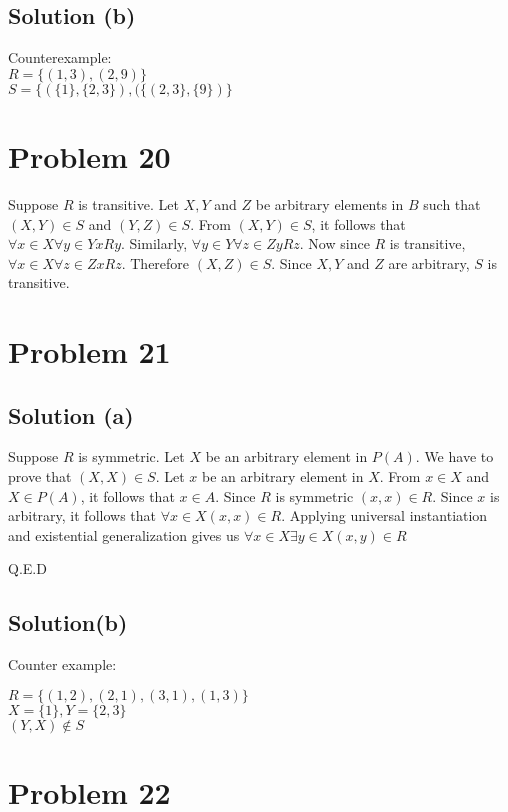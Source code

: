 \documentclass{article}
\begin{document}
\subsection{Solution (b)}

Counterexample: \\
$R = \{(1,3), (2,9)\}$ \\
$S = \{(\{1\},\{2,3\}), (\{(2,3\}, \{9\})\}$ 

\section{Problem 20}

Suppose $R$ is transitive. Let $X,Y$ and $Z$ be arbitrary elements in
$B$ such that $(X,Y) \in S$ and $(Y,Z) \in S$. From $(X,Y) \in S$, it
follows that $\forall x \in X \forall y \in Y xRy$. Similarly,
$\forall y \in Y \forall z \in Z yRz$. Now since $R$ is transitive,
$\forall x \in X \forall z \in Z xRz$. Therefore $(X,Z) \in S$. Since
$X,Y$ and $Z$ are arbitrary, $S$ is transitive.

\section{Problem 21}

\subsection{Solution (a)}

Suppose $R$ is symmetric. Let $X$ be an arbitrary element in $P(A)$.
We have to prove that $(X,X) \in S$. Let $x$ be an arbitrary element
in $X$. From $x \in X$ and $X \in P(A)$, it follows that $x \in A$.
Since $R$ is symmetric $(x,x) \in R$. Since $x$ is arbitrary, it
follows that $\forall x \in X (x,x) \in R$. Applying universal
instantiation and existential generalization gives us $\forall x \in X
\exists y \in X(x,y) \in R$

Q.E.D

\subsection{Solution(b)}

Counter example:

$R = \{(1,2), (2,1), (3,1), (1,3)\}$ \\
$X = \{1\}, Y = \{2,3\}$ \\
$(Y,X) \notin S$

\section{Problem 22}
\end{document}
